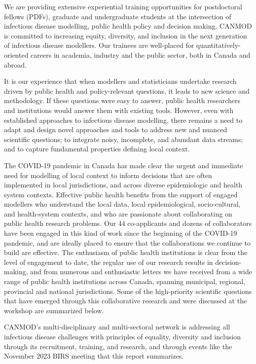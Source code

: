 We are providing extensive experiential training opportunities for
postdoctoral fellows (PDFs), graduate and undergraduate students at
the intersection of infectious disease modelling, public health policy
and decision making. CANMOD is committed to increasing equity,
diversity, and inclusion in the next generation of infectious disease
modellers. Our trainees are well-placed for quantitatively-oriented
careers in academia, industry and the public sector, both in Canada
and abroad.

It is our experience that when modellers and statisticians undertake
research driven by public health and policy-relevant questions, it
leads to new science and methodology. If these questions were easy to
answer, public health researchers and institutions would answer them
with existing tools. However, even with established approaches to
infectious disease modelling, there remains a need to adapt and design
novel approaches and tools to address new and nuanced scientific
questions; to integrate noisy, incomplete, and abundant data streams;
and to capture fundamental properties defining local context. 

The
COVID-19 pandemic in Canada has made clear the urgent and immediate
need for modelling of local context to inform decisions that are often
implemented in local jurisdictions, and across diverse epidemiologic
and health system contexts. Effective public health benefits from the
support of engaged modellers who understand the local data, local
epidemiological, socio-cultural, and health-system contexts, and who
are passionate about collaborating on public health research
problems. Our 44 co-applicants and dozens of collaborators have been
engaged in this kind of work since the beginning of the COVID-19
pandemic, and are ideally placed to ensure that the collaborations we
continue to build are effective. The enthusiasm of public health
institutions is clear from the level of engagement to date, the
regular use of our research results in decision-making, and from
numerous and enthusiastic letters we have received from a wide range
of public health institutions across Canada, spanning municipal,
regional, provincial and national jurisdictions. Some of the
high-priority scientific questions that have emerged through this
collaborative research and were discussed at the workshop
are summarized below.

CANMOD’s multi-disciplinary and multi-sectoral network is addressing
all infectious disease challenges with principles of equality,
diversity and inclusion through its recruitment, training, and
research, and through events like the November 2023 BIRS meeting that
this report summarizes.
